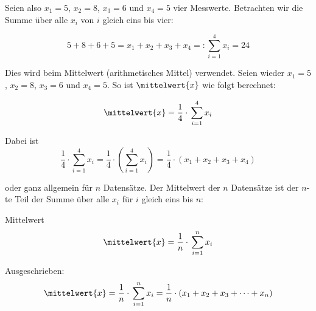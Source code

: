 Seien also $x_1=5$, $x_2=8$, $x_3=6$ und $x_4=5$ vier
Messwerte. Betrachten wir die Summe über
alle $x_i$ von $i$ gleich eins bis vier:

$$5+8+6+5 = x_1 + x_2 + x_3 + x_4 =: \sum_{i=1}^4{x_i}=24$$


Dies wird \zB beim Mittelwert (arithmetisches Mittel)
verwendet. Seien wieder $x_1=5$, $x_2=8$, $x_3=6$ und $x_4=5$. So ist
$\mittelwert{x}$ wie folgt berechnet:

$$\mittelwert{x} = \frac{1}{4}\cdot{}\sum_{i=1}^{4}{x_i}$$

Dabei ist $$\frac{1}{4}\cdot{}\sum_{i=1}^{4}{x_i}=\frac{1}{4}\cdot{}\left( \sum_{i=1}^{4}{x_i}\right) =\frac{1}{4}\cdot{}(x_1 + x_2 + x_3 + x_4)$$

oder ganz allgemein für $n$ Datensätze. Der Mittelwert der $n$
Datensätze ist der $n$-te Teil der Summe über alle $x_i$ für $i$
gleich eins bis $n$:

\begin{gesetz}{Mittelwert}{}
$$\mittelwert{x} = \frac{1}{n}\cdot{}\sum_{i=1}^{n}{x_i}$$
\end{gesetz}

Ausgeschrieben:
$$\mittelwert{x} = \frac{1}{n}\cdot{}\sum_{i=1}^{n}{x_i} = \frac{1}{n}\cdot{}(x_1 + x_2 + x_3 + \dots + x_n)$$


\newpage
